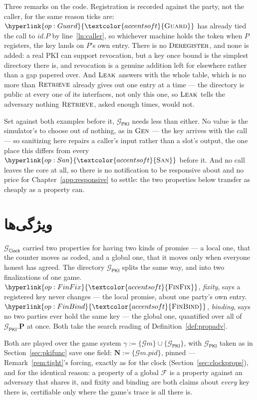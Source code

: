 \documentclass[10pt,oneside,openany]{book}
\newcommand{\Ps}{\mathbf{P}}
\newcommand{\PID}{\mathit{pid}}
\newcommand{\admits}{\mathbf{N}}
\newcommand{\F}{\mathcal{F}}
\newcommand{\op}[1]{\textnormal{\textsc{#1}}}
\newcommand{\opl}[1]{\hyperlink{op:#1}{\textcolor{accentsoft}{\op{#1}}}}
\newcommand{\id}{id}
\newcommand{\Gm}{\mathcal{G}m}
\newcommand{\Gclock}{\mathcal{G}_{\mathsf{Clock}}}
\newcommand{\Gpki}{\mathcal{G}_{\mathsf{PKI}}}
\newcommand{\San}{\opl{San}}
\theoremstyle{accentdef}
\theoremstyle{accentplain}
\begin{document}
Three remarks on the code. Registration is recorded against the party, not the caller, for the
same reason ticks are: $\opl{Guard}$ has already tied the call to $\id.P$ by line~\ref{ln:caller},
so whichever machine holds the token when $P$ registers, the key lands on $P$'s own entry. There
is no $\op{Deregister}$, and none is added: a real PKI can support revocation, but a key once
bound is the simplest directory there is, and revocation is a genuine addition left for elsewhere
rather than a gap papered over. And $\op{Leak}$ answers with the whole table, which is no more
than $\op{Retrieve}$ already gives out one entry at a time --- the directory is public at every
one of its interfaces, not only this one, so $\op{Leak}$ tells the adversary nothing $\op{Retrieve}$,
asked enough times, would not.

Set against both examples before it, $\Gpki$ needs less than either. No value is the simulator's
to choose out of nothing, as in $\op{Gen}$ --- the key arrives with the call --- so sanitizing here
repairs a caller's input rather than a slot's output, the one place this differs from every $\San$
before it. And no call leaves the core at all, so there is no notification to be responsive about
and no price for Chapter~\ref{app:responsive} to settle: the two properties below transfer as
cheaply as a property can.

\section{ویژگی‌ها}\label{sec:pkiprops}

$\Gclock$ carried two properties for having two kinds of promise --- a local one, that the counter
moves as coded, and a global one, that it moves only when everyone honest has agreed. The directory $\Gpki$
splits the same way, and into two finalizations of one game. $\opl{FinFix}$, \emph{fixity}, says a
registered key never changes --- the local
promise, about one party's own entry. $\opl{FinBind}$, \emph{binding}, says no two parties ever
hold the same key --- the global one, quantified over all of $\Gpki.\Ps$ at once. Both take the
search reading of Definition~\ref{def:propadv}.

Both are played over the game system $\gamma := \{\Gm\} \cup \{\Gpki\}$, with $\Gpki$ taken as in
Section~\ref{sec:pkifunc} save one field: $\admits := \{\Gm.\PID\}$, pinned --- Remark~\ref{rem:tight}'s
forcing, exactly as for the clock (Section~\ref{sec:clockprops}), and for the identical reason: a
property of a global $\F$ is a property against an adversary that shares it, and fixity and
binding are both claims about \emph{every} key there is, certifiable only where the game's trace
is all there is.
\end{document}
